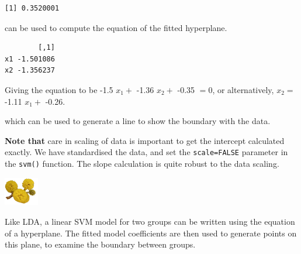 \documentclass[
  letterpaper,
]{krantz}
\newenvironment{Shaded}{\begin{snugshade}}{\end{snugshade}}
\newcommand{\AttributeTok}[1]{\textcolor[rgb]{0.40,0.45,0.13}{#1}}
\newcommand{\DecValTok}[1]{\textcolor[rgb]{0.68,0.00,0.00}{#1}}
\newcommand{\FunctionTok}[1]{\textcolor[rgb]{0.28,0.35,0.67}{#1}}
\newcommand{\NormalTok}[1]{\textcolor[rgb]{0.00,0.23,0.31}{#1}}
\newcommand{\OtherTok}[1]{\textcolor[rgb]{0.00,0.23,0.31}{#1}}
\newcommand{\SpecialCharTok}[1]{\textcolor[rgb]{0.37,0.37,0.37}{#1}}
\newcommand{\infobox}[1]{%
\noindent\colorbox{info!30}{%
\begin{minipage}{0.98\linewidth}%
    \centering%
    \begin{minipage}[c]{0.15\linewidth} %
      \includegraphics[width=1.5cm]{images/mulga-flowers2.png} %
    \end{minipage}%
    \hfill %
    \begin{minipage}[c]{0.8\linewidth} %
      \bigskip%
      \textsf{#1}%
      \bigskip%
    \end{minipage}%
    \hspace*{3mm}%
  \end{minipage}%
}%
}
\begin{document}
\begin{Shaded}
\end{Shaded}

\begin{verbatim}
[1] 0.3520001
\end{verbatim}

can be used to compute the equation of the fitted hyperplane.

\begin{Shaded}
\end{Shaded}

\begin{verbatim}
        [,1]
x1 -1.501086
x2 -1.356237
\end{verbatim}

Giving the equation to be -1.5 \(x_1 +\) -1.36 \(x_2 +\) -0.35 \(=0\),
or alternatively, \(x_2 =\) -1.11 \(x_1 +\) -0.26.

which can be used to generate a line to show the boundary with the data.

\begin{Shaded}
\end{Shaded}

\textbf{Note that} care in scaling of data is important to get the
intercept calculated exactly. We have standardised the data, and set the
\texttt{scale=FALSE} parameter in the \texttt{svm()} function. The slope
calculation is quite robust to the data scaling.

\infobox{Like LDA, a linear SVM model for two groups can be written using the equation of a hyperplane. The fitted model coefficients are then used to generate points on this plane, to examine the boundary between groups.
}
\end{document}
